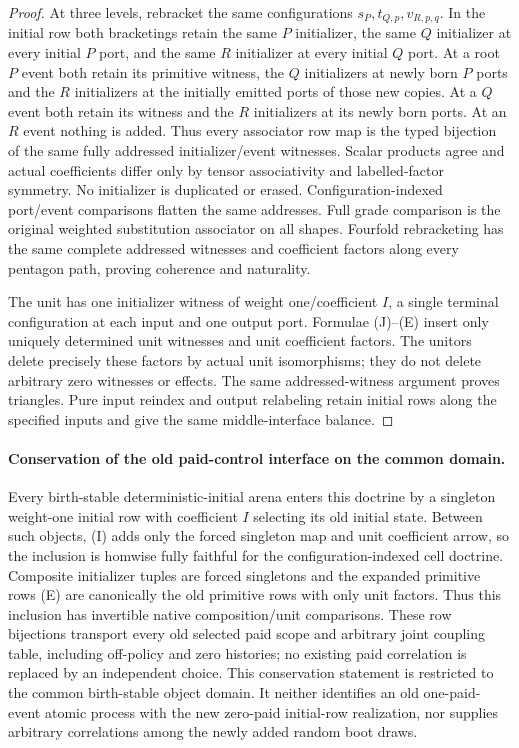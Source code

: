 \documentclass[11pt]{article}
\begin{document}
\begin{proof}
At three levels, rebracket the same configurations $s_P,t_{Q,p},v_{R,p,q}$. In the initial row both bracketings retain the same $P$ initializer, the same $Q$ initializer at every initial $P$ port, and the same $R$ initializer at every initial $Q$ port. At a root $P$ event both retain its primitive witness, the $Q$ initializers at newly born $P$ ports and the $R$ initializers at the initially emitted ports of those new copies. At a $Q$ event both retain its witness and the $R$ initializers at its newly born ports. At an $R$ event nothing is added. Thus every associator row map is the typed bijection of the same fully addressed initializer/event witnesses. Scalar products agree and actual coefficients differ only by tensor associativity and labelled-factor symmetry. No initializer is duplicated or erased. Configuration-indexed port/event comparisons flatten the same addresses. Full grade comparison is the original weighted substitution associator on all shapes. Fourfold rebracketing has the same complete addressed witnesses and coefficient factors along every pentagon path, proving coherence and naturality.

The unit has one initializer witness of weight one/coefficient $I$, a single terminal configuration at each input and one output port. Formulae (J)--(E) insert only uniquely determined unit witnesses and unit coefficient factors. The unitors delete precisely these factors by actual unit isomorphisms; they do not delete arbitrary zero witnesses or effects. The same addressed-witness argument proves triangles. Pure input reindex and output relabeling retain initial rows along the specified inputs and give the same middle-interface balance.
\end{proof}

\paragraph{Conservation of the old paid-control interface on the common domain.}
Every birth-stable deterministic-initial arena enters this doctrine by a
singleton weight-one initial row with coefficient $I$ selecting its old
initial state. Between such objects, (I) adds only the forced singleton
map and unit coefficient arrow, so the inclusion is homwise fully faithful
for the configuration-indexed cell doctrine. Composite initializer tuples
are forced singletons and the expanded primitive rows (E) are canonically
the old primitive rows with only unit factors. Thus this inclusion has
invertible native composition/unit comparisons. These row bijections
transport every old selected paid scope and arbitrary joint coupling table,
including off-policy and zero histories; no existing paid correlation is
replaced by an independent choice. This conservation statement is restricted
to the common birth-stable object domain. It neither identifies an old
one-paid-event atomic process with the new zero-paid initial-row realization,
nor supplies arbitrary correlations among the newly added random boot draws.
\end{document}
